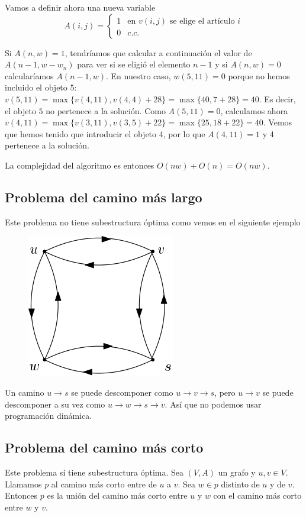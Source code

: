 \documentclass[AL.tex]{subfiles}
\begin{document}
\begin{ej}
Vamos a definir ahora una nueva variable
\[
A(i,j)=\begin{cases}
1 & \text{en }v(i,j)\text{ se elige el artículo }i\\
0 & c.c.
\end{cases}
\] 

Si $A(n,w)=1$, tendríamos que calcular a continuación el valor de $A(n-1, w-w_n)$ para ver si se eligió el elemento $n-1$ y si $A(n,w)=0$ calcularíamos $A(n-1,w)$. En nuestro caso, $w(5, 11)=0$ porque no hemos incluido el objeto 5: $v(5,11)=\max\{v(4,11),v(4,4)+28\}=\max\{40,7+28\}=40$. Es decir, el objeto $5$ no pertenece a la solución. Como $A(5,11)=0$, calculamos ahora $v(4,11)=\max\{v(3,11), v(3,5)+22\}=\max\{25, 18+22\}=40$. Vemos que hemos tenido que introducir el objeto 4, por lo que $A(4,11)=1$ y 4 pertenece a la solución.

La complejidad del algoritmo es entonces $O(nw)+O(n)=O(nw)$. 
\end{ej}

\subsection{Problema del camino más largo}
Este problema no tiene subestructura óptima como vemos en el siguiente ejemplo

\begin{figure}[h!]
\includegraphics[scale=0.6]{caminolargo}
\end{figure}
Un camino $u\to s$ se puede descomponer como $u\to v\to s$, pero $u\to v$ se puede descomponer a su vez como $u\to w\to s\to v$. Así que no podemos usar programación dinámica.

\subsection{Problema del camino más corto}
Este problema sí tiene subestructura óptima. Sea $(V,A)$ un grafo y $u,v\in V$. Llamamos $p$ al camino más corto entre de $u$ a $v$.  Sea $w\in p$ distinto de $u$ y de $v$. Entonces $p$ es la unión del camino más corto entre $u$ y $w$ con el camino más corto entre $w$ y $v$. 
\end{document}
